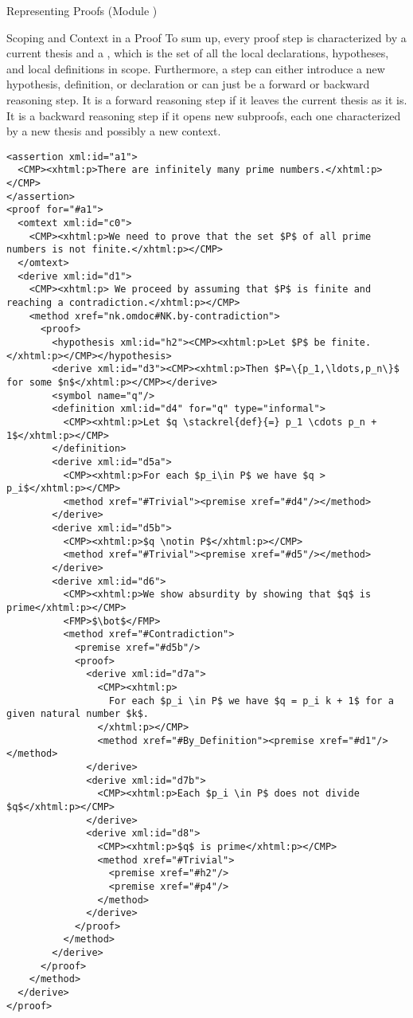 \begin{tchapter}[id=proofs,short=Representing Proofs]{Representing Proofs (Module {})}
\begin{tsection}[id=proofs:scoping]{Scoping and Context in a Proof}
  To sum up, every proof step is characterized by a current thesis and a
  {}, which is the set of all the local declarations, hypotheses,
  and local definitions in scope. Furthermore, a step can either introduce a new
  hypothesis, definition, or declaration or can just be a forward or backward
  reasoning step.  It is a forward reasoning {} step if it leaves the current
  thesis as it is.  It is a backward reasoning {} step if it opens new
  subproofs, each one characterized by a new thesis and possibly a new context.

\begin{lstlisting}[label=lst:primes-omdoc,mathescape,
  caption={A top-down Representation of the Proof in {\myfigref{pf-example1-math}}.},
  index={symbol,definition}]
<assertion xml:id="a1">
  <CMP><xhtml:p>There are infinitely many prime numbers.</xhtml:p></CMP>
</assertion>
<proof for="#a1">
  <omtext xml:id="c0">
    <CMP><xhtml:p>We need to prove that the set $P$ of all prime numbers is not finite.</xhtml:p></CMP>
  </omtext>
  <derive xml:id="d1">
    <CMP><xhtml:p> We proceed by assuming that $P$ is finite and reaching a contradiction.</xhtml:p></CMP>
    <method xref="nk.omdoc#NK.by-contradiction">
      <proof>
        <hypothesis xml:id="h2"><CMP><xhtml:p>Let $P$ be finite.</xhtml:p></CMP></hypothesis>
        <derive xml:id="d3"><CMP><xhtml:p>Then $P=\{p_1,\ldots,p_n\}$ for some $n$</xhtml:p></CMP></derive>
        <symbol name="q"/>
        <definition xml:id="d4" for="q" type="informal">
          <CMP><xhtml:p>Let $q \stackrel{def}{=} p_1 \cdots p_n + 1$</xhtml:p></CMP>
        </definition>
        <derive xml:id="d5a">
          <CMP><xhtml:p>For each $p_i\in P$ we have $q > p_i$</xhtml:p></CMP>
          <method xref="#Trivial"><premise xref="#d4"/></method>
        </derive>
        <derive xml:id="d5b">
          <CMP><xhtml:p>$q \notin P$</xhtml:p></CMP>
          <method xref="#Trivial"><premise xref="#d5"/></method>
        </derive>
        <derive xml:id="d6">
          <CMP><xhtml:p>We show absurdity by showing that $q$ is prime</xhtml:p></CMP>
          <FMP>$\bot$</FMP>
          <method xref="#Contradiction">
            <premise xref="#d5b"/>
            <proof>
              <derive xml:id="d7a">
                <CMP><xhtml:p>
                  For each $p_i \in P$ we have $q = p_i k + 1$ for a given natural number $k$.
                </xhtml:p></CMP>
                <method xref="#By_Definition"><premise xref="#d1"/></method>
              </derive>
              <derive xml:id="d7b">
                <CMP><xhtml:p>Each $p_i \in P$ does not divide $q$</xhtml:p></CMP>
              </derive>
              <derive xml:id="d8">
                <CMP><xhtml:p>$q$ is prime</xhtml:p></CMP>
                <method xref="#Trivial">
                  <premise xref="#h2"/>
                  <premise xref="#p4"/>
                </method>
              </derive>
            </proof>
          </method>
        </derive>
      </proof>
    </method>
  </derive>
</proof>
\end{lstlisting}


\end{tsection}
\end{tchapter}
